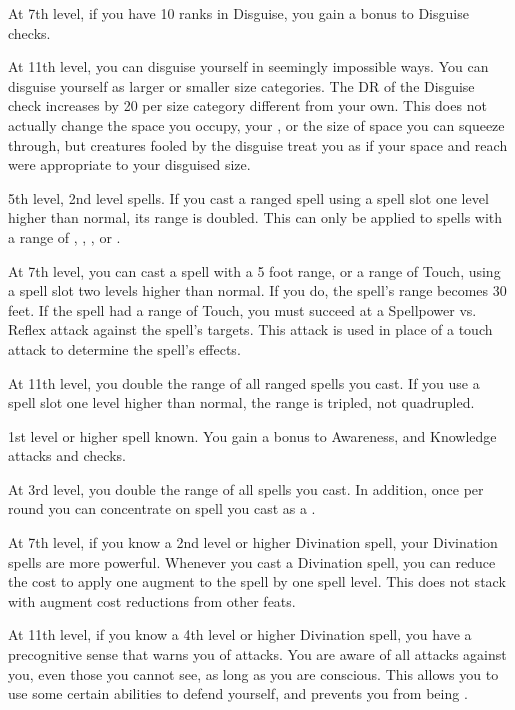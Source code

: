    At 7th level, if you have 10 ranks in Disguise, you gain a  bonus to Disguise checks.

    At 11th level, you can disguise yourself in seemingly impossible ways.
    You can disguise yourself as larger or smaller size categories.
    The DR of the Disguise check increases by 20 per size category different from your own.
    This does not actually change the space you occupy, your , or the size of space you can squeeze through, but creatures fooled by the disguise treat you as if your space and reach were appropriate to your disguised size.
    \magical

    \featpre 5th level, 2nd level spells.
    \featben If you cast a ranged spell using a spell slot one level higher than normal, its range is doubled.
    This can only be applied to spells with a range of \rngclose, \rngmed, \rnglong, or \rngext.

    At 7th level, you can cast a spell with a 5 foot range, or a range of Touch, using a spell slot two levels higher than normal.
    If you do, the spell's range becomes 30 feet.
    If the spell had a range of Touch, you must succeed at a Spellpower vs. Reflex attack against the spell's targets.
    This attack is used in place of a touch attack to determine the spell's effects.

    At 11th level, you double the range of all ranged spells you cast.
    If you use a spell slot one level higher than normal, the range is tripled, not quadrupled.

    \featpre 1st level or higher  spell known.
    \featben You gain a  bonus to Awareness, and Knowledge attacks and checks.

    At 3rd level, you double the range of all  spells you cast.
    In addition, once per round you can concentrate on  spell you cast as a .

    At 7th level, if you know a 2nd level or higher Divination spell, your Divination spells are more powerful.
    Whenever you cast a Divination spell, you can reduce the cost to apply one augment to the spell by one spell level.
    This does not stack with augment cost reductions from other feats.

    At 11th level, if you know a 4th level or higher Divination spell, you have a precognitive sense that warns you of attacks.
    You are aware of all attacks against you, even those you cannot see, as long as you are conscious.
    This allows you to use some certain abilities to defend yourself, and prevents you from being \unaware.

